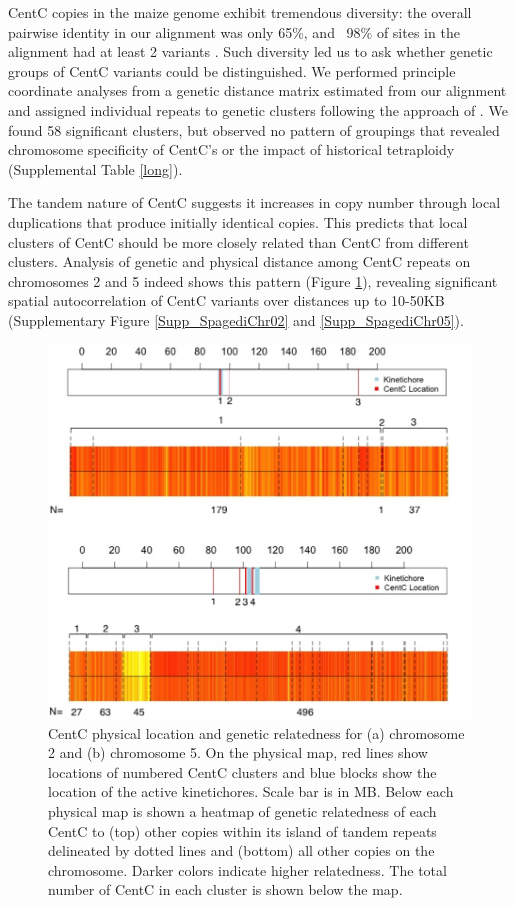 CentC copies in the maize genome exhibit tremendous diversity: the overall pairwise identity in our alignment was only 65\%, and ~98\% of sites in the alignment had at least 2 variants .  Such diversity led us to ask whether genetic groups of CentC variants could be distinguished. We performed principle coordinate analyses from a genetic distance matrix estimated from our alignment and assigned individual repeats to  genetic clusters following the approach of \citet{Patterson2006}.  We found 58 significant clusters, but observed no pattern of groupings that revealed chromosome specificity of CentC’s or the impact of historical tetraploidy (Supplemental Table \ref{long}).

The tandem nature of CentC suggests it increases in copy number through local duplications that produce initially identical copies.  This predicts that local clusters of CentC should be more closely related than CentC from different clusters.  Analysis of genetic and physical distance among CentC repeats on chromosomes 2 and 5 indeed shows this pattern (Figure \ref{heatmap}), revealing significant spatial autocorrelation of CentC variants over distances up to 10-50KB (Supplementary Figure \ref{Supp_SpagediChr02} and \ref{Supp_SpagediChr05}).

\begin{figure}
\includegraphics[width=1\textwidth]{heatmap.png}
\caption{CentC physical location and genetic relatedness for (a) chromosome 2 and (b) chromosome 5.  On the physical map, red lines show locations of numbered CentC clusters and blue blocks show the location of the active kinetichores.  Scale bar is in MB.  Below each physical map is shown a heatmap of genetic relatedness of each CentC to (top) other copies within its island of tandem repeats delineated by dotted lines and (bottom) all other copies on the chromosome.  Darker colors indicate higher relatedness.  The total number of CentC in each cluster is shown below the map.  
}
\label{heatmap}    
\end{figure}

